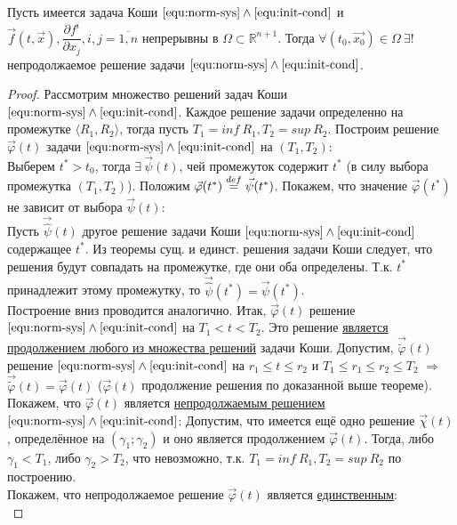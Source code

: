 \begin{theorem}
	Пусть имеется задача Коши $\eqref{equ:norm-sys} \wedge \eqref{equ:init-cond}$ и $\vec{f}(t, \vec{x}), \dfrac{\partial f^i}{\partial x_j}, i, j = \overline{1, n}$ непрерывны в $\Omega \subset \mathbb{R}^{n+1}$. Тогда $\forall (t_0, \vec{x_0}) \in \Omega \ \exists!$ непродолжаемое решение задачи $\eqref{equ:norm-sys} \wedge \eqref{equ:init-cond}$.
\end{theorem}
\begin{proof}
	Рассмотрим множество решений задач Коши $\eqref{equ:norm-sys} \wedge \eqref{equ:init-cond}$. Каждое решение задачи определенно на промежутке $\langle R_1, R_2 \rangle$, тогда пусть $T_1 = inf\ R_1, T_2 = sup\ R_2$. Построим решение $\vec{\varphi}(t)$ задачи $\eqref{equ:norm-sys} \wedge \eqref{equ:init-cond}$ на $(T_1, T_2)$:\\
	Выберем $t^* > t_0$, тогда $\exists\ \vec{\psi}(t)$, чей промежуток содержит $t^*$ (в силу выбора промежутка $(T_1, T_2)$). Положим $\vec{\varphi}(t^*) \stackrel{def}{=} \vec{\psi}(t^*)$. Покажем, что значение $\vec{\varphi}(t^*)$ не зависит от выбора $\vec{\psi}(t)$:\\
	Пусть $\displaystyle \vec{\hat{\psi}}(t)$ другое решение задачи Коши $\eqref{equ:norm-sys} \wedge \eqref{equ:init-cond}$ содержащее $t^*$. Из теоремы сущ. и единст. решения задачи Коши следует, что решения будут совпадать на промежутке, где они оба определены. Т.к. $t^*$ принадлежит этому промежутку, то $\vec{\hat{\psi}}(t^*) = \vec{\psi}(t^*)$.\\ 
	Построение вниз проводится аналогично. Итак, $\vec{\varphi}(t)$ решение $\eqref{equ:norm-sys} \wedge \eqref{equ:init-cond}$ на $T_1 < t < T_2$. Это решение \underline{является продолжением любого из множества решений} задачи Коши. Допустим, $\vec{\widetilde{\varphi}}(t)$ решение $\eqref{equ:norm-sys} \wedge \eqref{equ:init-cond}$ на $r_1 \leq t \leq r_2$ и $T_1 \leq r_1 \leq r_2 \leq T_2$ $\Rightarrow$ $\vec{\widetilde{\varphi}}(t) = \vec{\varphi}(t)$ ($\vec{\varphi}(t)$ продолжение решения по доказанной выше теореме). \\Покажем, что $\vec{\varphi}(t)$ является \underline{непродолжаемым решением} $\eqref{equ:norm-sys} \wedge \eqref{equ:init-cond}$:
	Допустим, что имеется ещё  одно решение $\vec{\chi}(t)$, определённое на $(\gamma_1; \gamma_2)$ и оно является продолжением $\vec{\varphi}(t)$. Тогда, либо $\gamma_1 < T_1$, либо $\gamma_2 > T_2$, что невозможно, т.к. $T_1 = inf\ R_1, T_2 = sup\ R_2$ по построению. \\
	Покажем, что непродолжаемое решение $\vec{\varphi}(t)$ является \underline{единственным}:\\

\end{proof}

